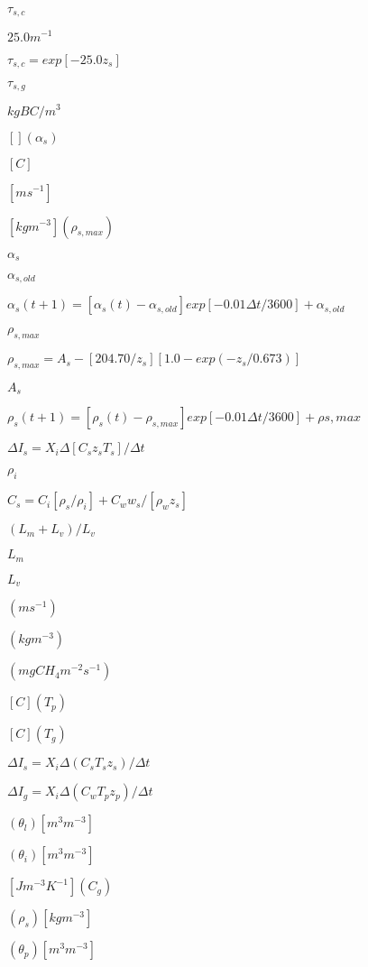 \documentclass{article}
\begin{document}
{$\tau_{s,c}$
\pagebreak

$25.0 m^{-1}$
\pagebreak

$\tau_{s,c} = exp[-25.0 z_s]$
\pagebreak

$\tau_{s,g}$
\pagebreak

$kg BC/m^3$
\pagebreak

$[ ] (\alpha_s)$
\pagebreak

$[C]$
\pagebreak

$[m s^{-1}] $
\pagebreak

$[kg m^{-3}] (\rho_{s,max})$
\pagebreak

$\alpha_s$
\pagebreak

$\alpha_{s,old}$
\pagebreak

$\alpha_s (t+1) = [\alpha_s (t) - \alpha_{s,old}] exp [-0.01 \Delta t / 3600] + \alpha_{s,old}$
\pagebreak

$\rho_{s,max}$
\pagebreak

$\rho_{s,max} = A_s - [204.70/ z_s] [1.0 - exp(-z_s /0.673)]$
\pagebreak

$A_s$
\pagebreak

$\rho_s (t+1) = [\rho_s (t) - \rho_{s,max} ] exp [-0.01 \Delta t/3600] + \rho{s,max}$
\pagebreak

$\Delta I_s = X_i \Delta [ C_s z_s T_s ] / \Delta t$
\pagebreak

$\rho_i$
\pagebreak

$C_s = C_i [\rho_s / \rho_i ] + C_w w_s /[\rho_w z_s]$
\pagebreak

$(L_m+ L_v)/L_v$
\pagebreak

$L_m$
\pagebreak

$L_v$
\pagebreak

$(m s^{-1})$
\pagebreak

$(kg m^{-3})$
\pagebreak

$(mg CH_4 m^{-2} s^{-1})$
\pagebreak

$[C] (T_p)$
\pagebreak

$[C] (T_g)$
\pagebreak

$\Delta I_s = X_i \Delta(C_s T_s z_s) / \Delta t$
\pagebreak

$\Delta I_g = X_i \Delta(C_w T_p z_p)/\Delta t$
\pagebreak

$(\theta_l) [m^3 m^{-3}]$
\pagebreak

$(\theta_i) [m^3 m^{-3}]$
\pagebreak

$[J m^{-3} K^{-1}] (C_g)$
\pagebreak

$(\rho_s) [kg m^{-3}]$
\pagebreak

$(\theta_p) [m^3 m^{-3}]$
\pagebreak

}
\end{document}

